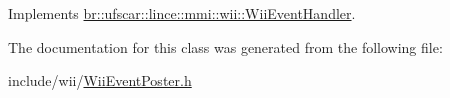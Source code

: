 Implements \hyperlink{classbr_1_1ufscar_1_1lince_1_1mmi_1_1wii_1_1WiiEventHandler_a7e94bf7dc7fa2dd0552ff2c97faf9f41}{br::ufscar::lince::mmi::wii::WiiEventHandler}.



The documentation for this class was generated from the following file:\begin{DoxyCompactItemize}
\item 
include/wii/\hyperlink{WiiEventPoster_8h}{WiiEventPoster.h}\end{DoxyCompactItemize}
